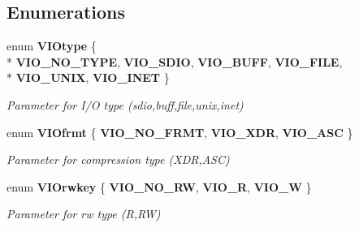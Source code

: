 \subsection*{Enumerations}
\begin{DoxyCompactItemize}
\item 
enum {\bf V\-I\-Otype} \{ \\*
{\bf V\-I\-O\-\_\-\-N\-O\-\_\-\-T\-Y\-P\-E}, 
{\bf V\-I\-O\-\_\-\-S\-D\-I\-O}, 
{\bf V\-I\-O\-\_\-\-B\-U\-F\-F}, 
{\bf V\-I\-O\-\_\-\-F\-I\-L\-E}, 
\\*
{\bf V\-I\-O\-\_\-\-U\-N\-I\-X}, 
{\bf V\-I\-O\-\_\-\-I\-N\-E\-T}
 \}
\begin{DoxyCompactList}\small\item\em Parameter for I/\-O type (sdio,buff,file,unix,inet) \end{DoxyCompactList}\item 
enum {\bf V\-I\-Ofrmt} \{ {\bf V\-I\-O\-\_\-\-N\-O\-\_\-\-F\-R\-M\-T}, 
{\bf V\-I\-O\-\_\-\-X\-D\-R}, 
{\bf V\-I\-O\-\_\-\-A\-S\-C}
 \}
\begin{DoxyCompactList}\small\item\em Parameter for compression type (X\-D\-R,A\-S\-C) \end{DoxyCompactList}\item 
enum {\bf V\-I\-Orwkey} \{ {\bf V\-I\-O\-\_\-\-N\-O\-\_\-\-R\-W}, 
{\bf V\-I\-O\-\_\-\-R}, 
{\bf V\-I\-O\-\_\-\-W}
 \}
\begin{DoxyCompactList}\small\item\em Parameter for rw type (R,R\-W) \end{DoxyCompactList}\end{DoxyCompactItemize}
